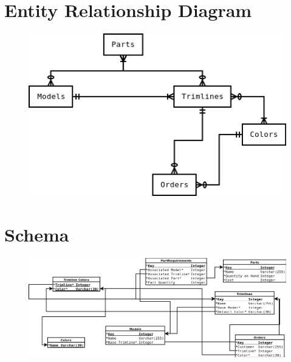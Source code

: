 \documentclass[11pt,letterpaper,oneside]{amsart}
\begin{document}
\section*{Entity Relationship Diagram}

\begin{figure}[H]
	\centerline{\includegraphics[scale=1.2]{erddraft.png}}
\end{figure}

\section*{Schema}

\begin{figure}[H]
	\centerline{\includegraphics[scale=.55]{schema.png}}
\end{figure}
\end{document}
